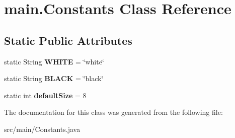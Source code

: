\hypertarget{classmain_1_1_constants}{}\section{main.\+Constants Class Reference}
\label{classmain_1_1_constants}
\subsection*{Static Public Attributes}
\begin{DoxyCompactItemize}
\item 
\mbox{\label{classmain_1_1_constants_a9b9f8872ab9bc76a3fa8ce2c21af1766}} 
static String {\bfseries W\+H\+I\+TE} = \char`\"{}white\char`\"{}
\item 
\mbox{\label{classmain_1_1_constants_a325121a63e275432ab06b058c4ee7a53}} 
static String {\bfseries B\+L\+A\+CK} = \char`\"{}black\char`\"{}
\item 
\mbox{\label{classmain_1_1_constants_af72927b5c638a1180e68a16eb1410e11}} 
static int {\bfseries default\+Size} = 8
\end{DoxyCompactItemize}


The documentation for this class was generated from the following file\+:\begin{DoxyCompactItemize}
\item 
src/main/Constants.\+java\end{DoxyCompactItemize}
